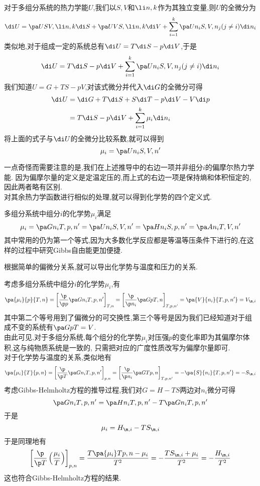 \documentclass{ctexart}
\begin{document}
\begin{derivation}
    对于多组分系统的热力学能$U$,我们以$S,V$和$\li n,k$作为其独立变量,则$U$的全微分为
    \[\di U=\pa US{V,\li n,k}\di S+\pa UV{S,\li n,k}\di V+\sum_{i=1}^{k}\pa U{n_i}{S,V,n_{j}(j\neq i)}\di n_i\]
    类似地,对于组成一定的系统总有$\di U=T\di S-p\di V$,于是
    \[\di U=T\di S-p\di V+\sum_{i=1}^{k}\pa U{n_i}{S,V,n_{j}(j\neq i)}\di n_i\]
    我们知道$U=G+TS-pV$,对该式微分并代入$\di G$的全微分可得
    \[\begin{aligned}
        \di U
        &= \di G+T\di S+S\di T-p\di V-V\di p \\
        &= T\di S-p\di V+\sum_{i=1}^k\mu_i\di n_i
    \end{aligned}\]
    将上面的式子与$\di U$的全微分比较系数,就可以得到
    \[\mu_i=\pa U{n_i}{S,V,n'}\]

\end{derivation}
一点奇怪而需要注意的是,我们在上述推导中的右边一项并非组分$i$的偏摩尔热力学能.%
因为偏摩尔量的定义是定温定压的,而上式的右边一项是保持熵和体积恒定的,因此两者略有区别.\\
\indent 对其余热力学函数进行相似的处理,就可以得到化学势的四个定义式.
\begin{definition}[4B.3.2 化学势]
    多组分系统中组分$i$的化学势$\mu_i$满足
    \[\mu_i=\pa G{n_i}{T,p,n'}=\pa U{n_i}{S,V,n'}=\pa H{n_i}{S,p,n'}=\pa A{n_i}{T,V,n'}\]
    其中常用的仍为第一个等式,因为大多数化学反应都是等温等压条件下进行的,在这样的过程中研究Gibbs自由能更加便捷.
\end{definition}
\indent 根据简单的偏微分关系,就可以导出化学势与温度和压力的关系.
\begin{derivation}
    考虑多组分系统中组分$i$的化学势$\mu_i$,有
    \[\pa{\mu_i}{p}{T,n}
    =\left[\dfrac{\p}{\p p}\pa G{n_i}{T,p,n'}\right]_{T,n}
    =\left[\dfrac{\p}{\p n_i}\pa Gp{T,n}\right]_{T,p,n'}
    =\pa{V}{n_i}{T,p,n'}=V_{\m,i}\]
    其中第二个等号用到了偏微分的可交换性,第三个等号是因为我们已经知道对于组成不变的系统有$\pa GpT=V$.\\
    由此可见,对于多组分系统,每个组分的化学势$\mu_i$对压强$p$的变化率即为其偏摩尔体积,这与纯物质系统是一致的,%
    只需把对应的广度性质改写为偏摩尔量即可.\\
    对于化学势与温度的关系,类似地有
    \[\pa{\mu_i}{T}{p,n}
    =\left[\dfrac{\p}{\p T}\pa G{n_i}{T,p,n'}\right]_{p,n}
    =\left[\dfrac{\p}{\p n_i}\pa GT{p,n}\right]_{T,p,n'}
    =-\pa{S}{n_i}{T,p,n'}=-S_{\m,i}\]
    考虑Gibbs-Helmholtz方程的推导过程,我们对$G=H-TS$两边对$n_i$微分可得
    \[\pa G{n_i}{T,p,n'}=\pa H{n_i}{T,p,n'}-T\pa G{n_i}{T,p,n'}\]
    于是
    \[\mu_i=H_{\m,i}-TS_{\m,i}\]
    于是同理地有
    \[\left[\dfrac{\p}{\p T}\left(\dfrac{\mu_i}{T}\right)\right]_{p,n}
    =\dfrac{T\pa{\mu_i}T{p,n}-\mu_i}{T^2}=-\dfrac{TS_{\m,i}+\mu_i}{T^2}=-\dfrac{H_{\m,i}}{T^2}\]
    这也符合Gibbs-Helmholtz方程的结果.
\end{derivation}
\end{document}

